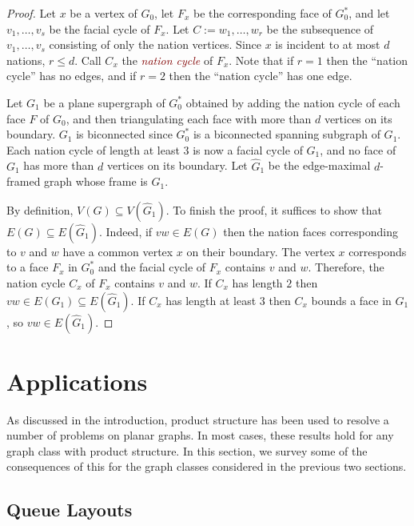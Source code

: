 \documentclass{patmorin}
\theoremstyle{plain}
\theoremstyle{definition}
\newcommand{\defin}[1]{\textcolor{Maroon}{\emph{#1}}}
\renewcommand{\le}{\leqslant}
\begin{document}
\begin{proof}
Let $x$ be a vertex of $G_0$, let $F_x$ be the corresponding face of $G_0^*$, and let $v_1,\ldots,v_s$ be the facial cycle of $F_x$.  Let $C:=w_1,\ldots,w_r$ be the subsequence of $v_1,\ldots,v_s$ consisting of only the nation vertices.  Since $x$ is incident to at most $d$ nations, $r\le d$. Call $C_x$ the \defin{nation cycle} of $F_x$. Note that if $r=1$ then the ``nation cycle'' has no edges, and if $r=2$ then the ``nation cycle'' has one edge.

Let $G_1$ be a plane supergraph of $G_0^*$ obtained by adding the nation cycle of each face $F$ of $G_0$, and then triangulating each face with more than $d$ vertices on its boundary. $G_1$ is biconnected since $G^*_0$ is a biconnected spanning subgraph of $G_1$. Each nation cycle of length at least $3$ is now a facial cycle of $G_1$, and no face of $G_1$ has more than $d$ vertices on its boundary. Let $\widehat{G}_1$ be the edge-maximal $d$-framed graph whose frame is $G_1$.

By definition, $V(G) \subseteq V(\widehat{G}_1)$. To finish the proof, it suffices to show that $E(G)\subseteq E(\widehat{G}_1)$.  Indeed, if $vw\in E(G)$ then the nation faces corresponding to $v$ and $w$ have a common vertex $x$ on their boundary. The vertex $x$ corresponds to a face $F_x$ in $G_0^*$ and the facial cycle of $F_x$ contains $v$ and $w$.  Therefore, the nation cycle $C_x$ of $F_x$ contains $v$ and $w$. If $C_x$ has length $2$ then $vw\in E(G_1)\subseteq E(\widehat{G}_1)$.  If $C_x$ has length at least $3$ then $C_x$ bounds a face in $G_1$, so $vw\in E(\widehat{G}_1)$.
\end{proof}


\section{Applications}
\label{Applications}

As discussed in the introduction, product structure has been used to resolve a number of problems on planar graphs.  In most cases, these results hold for any graph class with product structure. In this section, we survey some of the consequences of this for the graph classes considered in the previous two sections.

\subsection{Queue Layouts}
\end{document}
